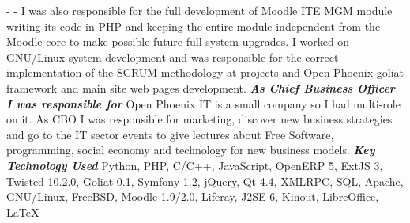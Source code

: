 \documentclass[11pt,a4paper,sans]{moderncv}
\begin{document}
{\newline{}  - \newline{}
  - \newline{}
\newline{}I was also responsible for the full development of Moodle ITE MGM module writing its code in PHP and keeping the entire module independent from the Moodle core to make possible future full system upgrades.
I worked on GNU/Linux system development and was responsible for the correct implementation of the SCRUM methodology at projects and Open Phoenix goliat framework and main site web pages development.\newline{}
{\bfseries \textit{As Chief Business Officer I was responsible for}}\newline{}
Open Phoenix IT is a small company so I had multi-role on it. As CBO I was responsible for marketing, discover new business strategies and go to the IT sector events to give lectures about Free Software, programming, social economy and technology for new business models.\newline{}
{\bfseries \textit{Key Technology Used}}\newline{}
Python, PHP, C/C++, JavaScript, OpenERP 5, ExtJS 3, Twisted 10.2.0, Goliat 0.1, Symfony 1.2, jQuery, Qt 4.4, XMLRPC, SQL, Apache, GNU/Linux, FreeBSD, Moodle 1.9/2.0, Liferay, J2SE 6, Kinout, LibreOffice, LaTeX
}
\end{document}

